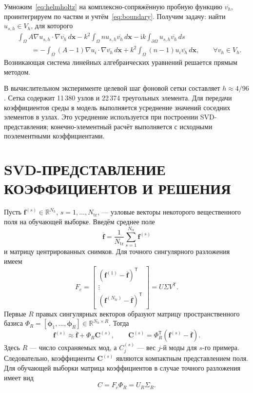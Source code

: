 \documentclass[notitle]{sibjima_preview}
\newcommand{\ii}{\mathrm{i}}
\newcommand{\R}{\mathbb{R}}
\begin{document}
Умножим~\eqref{eq:helmholtz} на комплексно-сопряжённую пробную функцию \(\overline{v_h}\), проинтегрируем по частям и учтём~\eqref{eq:boundary}. Получим задачу: найти \(u_{s,h}\in V_h\), для которого
\begin{align*}
&\int_\Omega A\nabla u_{s,h}\cdot\nabla\overline{v_h}\,d\bm{x}
-k^2\int_\Omega n u_{s,h}\overline{v_h}\,d\bm{x}
-\ii k\int_{\partial\Omega}u_{s,h}\overline{v_h}\,ds
\nonumber\\
&\qquad =
-\int_\Omega(A-1)\nabla u_i\cdot\nabla\overline{v_h}\,d\bm{x}
+k^2\int_\Omega(n-1)u_i\overline{v_h}\,d\bm{x},
\qquad \forall v_h\in V_h.
\end{align*}
Возникающая система линейных алгебраических уравнений решается прямым методом.

В вычислительном эксперименте целевой шаг фоновой сетки составляет \(h\approx4/96\). Сетка содержит 11\,380 узлов и 22\,374 треугольных элемента. Для передачи коэффициентов среды в модель выполняется усреднение значений соседних элементов в узлах. Это усреднение используется при построении SVD-представления; конечно-элементный расчёт выполняется с исходными поэлементными коэффициентами.

\section{SVD-ПРЕДСТАВЛЕНИЕ КОЭФФИЦИЕНТОВ И РЕШЕНИЯ}
Пусть \(\bm{f}^{(s)}\in\R^{N_h}\), \(s=1,\ldots,N_{\mathrm{tr}}\), --- узловые векторы некоторого вещественного поля на обучающей выборке. Введём среднее поле
\begin{equation*}
\overline{\bm{f}}=\frac{1}{N_{\mathrm{tr}}}\sum_{s=1}^{N_{\mathrm{tr}}}\bm{f}^{(s)}
\end{equation*}
и матрицу центрированных снимков. Для точного сингулярного разложения имеем
\begin{equation*}
F_c=
\begin{bmatrix}
(\bm{f}^{(1)}-\overline{\bm{f}})^\mathsf{T}\\
\vdots\\
(\bm{f}^{(N_{\mathrm{tr}})}-\overline{\bm{f}})^\mathsf{T}
\end{bmatrix}
=U\Sigma V^\mathsf{T}.
\end{equation*}
Первые \(R\) правых сингулярных векторов образуют матрицу пространственного базиса
\(\Phi_R=[\bm{\phi}_1,\ldots,\bm{\phi}_R]\in\R^{N_h\times R}\). Тогда
\begin{equation*}
\bm{f}^{(s)}\approx
\overline{\bm{f}}+\Phi_R\bm{C}^{(s)},\qquad
\bm{C}^{(s)}=\Phi_R^\mathsf{T}
(\bm{f}^{(s)}-\overline{\bm{f}}).
\end{equation*}
Здесь \(R\) --- число сохраняемых мод, а \(C_j^{(s)}\) --- вес \(j\)-й моды для \(s\)-го примера. Следовательно, коэффициенты \(\bm{C}^{(s)}\) являются компактным представлением поля. Для обучающей выборки матрица коэффициентов в случае точного разложения имеет вид
\begin{equation}
C=F_c\Phi_R=U_R\Sigma_R.
\tag{4}\label{eq:matrix_coefficients}
\end{equation}
\end{document}
